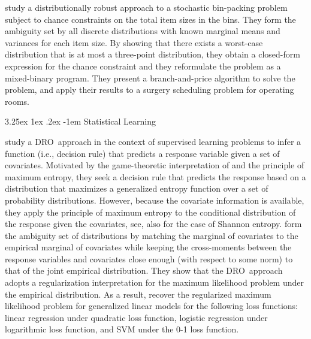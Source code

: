 \documentclass[final,onefignum,onetabnum]{class}
\makeatletter
\renewcommand\paragraph{\@startsection{paragraph}{4}{\z@}%
  {3.25ex \@plus1ex \@minus.2ex}%
  {-1em}%
  {\normalfont\normalsize\bfseries}}
\newcommand{\dro}{DRO}
\makeatother
\begin{document}
\citet{zhang2015bin} study a distributionally robust approach to a stochastic bin-packing problem subject to chance constraints on the total item sizes in the bins. They form the ambiguity set  by all discrete distributions with known marginal means and variances for each item size. By showing that there exists a worst-case distribution that is at most a three-point distribution, they obtain a closed-form expression for the chance constraint and they reformulate the problem as a mixed-binary program. They present 
a branch-and-price algorithm to solve the problem, and apply their results to a surgery scheduling problem for operating rooms. 




\paragraph{Statistical Learning}

\citet{farnia2016} study a \dro\ approach in the context of supervised learning problems to infer a function (i.e., decision rule) that predicts a response variable given a set of covariates. Motivated by the game-theoretic interpretation of \citet{grunwald2004game} and the principle of maximum entropy, they seek a   decision rule that predicts the response based on a distribution that maximizes a generalized entropy function over a set of probability distributions. However, because the covariate information is available,  they apply the principle of maximum entropy to the conditional distribution of the response given the covariates, see, also \citet{globerson2004} for the case of Shannon entropy.  \citet{farnia2016} form the ambiguity set of distributions by  matching the
marginal of covariates to the empirical marginal of covariates while keeping the cross-moments between the response variables and covariates close enough (with respect to some norm) to that of  the joint empirical distribution. They show that the \dro\ approach adopts a regularization interpretation for the maximum likelihood problem under the empirical distribution. As a result, \citet{farnia2016} recover the regularized maximum likelihood problem for generalized linear models for the following loss functions: linear regression under quadratic loss function, logistic regression under logarithmic loss function, and SVM under the 0-1 loss function. 
\end{document}
